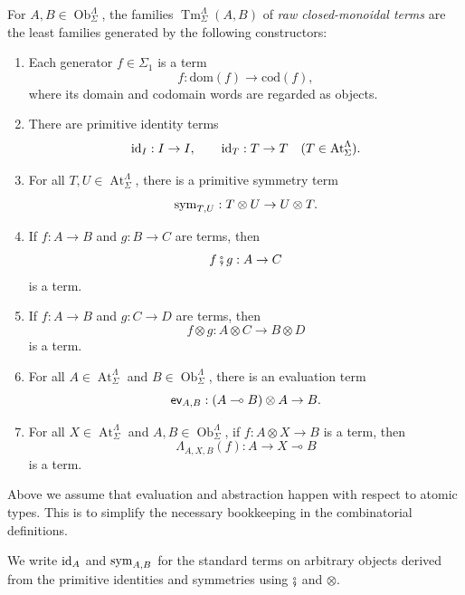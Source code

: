 \begin{definition}
For $A,B \in \operatorname{Ob}^{\Lambda}_{\Sigma}$, the
families $\operatorname{Tm}^{\Lambda}_{\Sigma}(A,B)$ of
\emph{raw closed-monoidal terms} are the least families
generated by the following constructors:
\begin{enumerate}
  \item Each generator $f \in \Sigma_1$ is a term
  \[
    f : \mathrm{dom}(f) \to \mathrm{cod}(f),
  \]
  where its domain and codomain words are regarded as objects.

  \item There are primitive identity terms
  \[
    \operatorname{id}_I : I \to I,
    \qquad
    \operatorname{id}_T : T \to T
    \quad
    (T \in \operatorname{At}^{\Lambda}_{\Sigma}).
  \]

  \item For all $T,U \in \operatorname{At}^{\Lambda}_{\Sigma}$,
  there is a primitive symmetry term
  \[
    \operatorname{sym}_{T,U} : T \otimes U \to U \otimes T.
  \]

  \item If $f : A \to B$ and $g : B \to C$ are terms,
  then
  \[
    f \fatsemi g : A \to C
  \]
  is a term.

  \item If $f : A \to B$ and $g : C \to D$ are terms,
  then
  \[
    f \otimes g : A \otimes C \to B \otimes D
  \]
  is a term.

  \item For all $A \in \operatorname{At}^{\Lambda}_{\Sigma}$ and $B \in \operatorname{Ob}^{\Lambda}_{\Sigma}$,
  there is an evaluation term
  \[
    \operatorname{\textsf{ev}}_{A,B} : (A \multimap B) \otimes A \to B.
  \]

  \item For all $X \in \operatorname{At}^{\Lambda}_{\Sigma}$ and $A,B \in \operatorname{Ob}^{\Lambda}_{\Sigma}$, if $f : A \otimes X \to B$ is a term, then
  \[
    \Lambda_{A,X,B}(f) : A \to X \multimap B
  \]
  is a term.
\end{enumerate}
\end{definition}

\begin{remark}
  Above we assume that evaluation and abstraction happen with respect to atomic types.
  This is to simplify the necessary bookkeeping in the combinatorial definitions.
\end{remark}

We write $\operatorname{id}_A$ and $\operatorname{sym}_{A,B}$ for the standard terms on arbitrary
objects derived from the primitive identities and symmetries using
$\fatsemi$ and $\otimes$.


